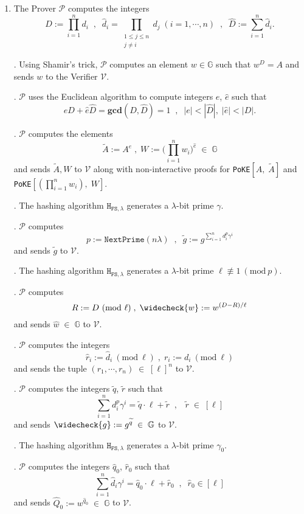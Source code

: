 \documentclass[11pt, lettersize, notitlepage, leqno, footskip=0.6cm]{article}
\newcommand{\pl}{\prod\limits}
\newcommand{\slim}{\sum\limits}
\newcommand{\ttt}{\texttt}
\newcommand{\bG}{\mathbb{G}}
\newcommand{\wti}{\widetilde}
\newcommand{\mc}{\mathcal}
\newcommand{\mb}{\mathbb}
\newcommand{\mbf}{\mathbf}
\newcommand{\lam}{\lambda}
\newcommand{\what}{\widehat}
\newcommand{\weck}{\widecheck}
\newcommand{\mP}{\mc{P}}
\newcommand{\V}{\mc{V}}
\newcommand{\vs}{\vspace{-0.15cm}}
\newcommand{\noin}{\noindent}
\newcommand{\Mod}[1]{\ (\mathrm{mod}\ #1)}
\newcommand{\GCD}{\mbf{gcd}}
\numberwithin{equation}{section}
\begin{document}
\begin{enumerate}[wide, labelwidth=!, labelindent=0pt]\vs \item The Prover $\mc{P}$ computes the integers \vs $$D := \prod\limits_{i=1}^n d_i\;\;,\;\;\what{d}_i = \pl_{\substack{1\leq j\leq n\\ j\neq i}} d_j\;(i=1,\cdots,n)\;\;,\;\; \what{D}:=\slim_{i=1}^n\what{d}_i.$$ \vs

\noin 2. Using Shamir's trick, $\mc{P}$ computes an element $w\in\mb{G}$ such that $w^D = A$ and sends $w$ to the Verifier $\mc{V}$.

\noin 3. $\mP$ uses the Euclidean algorithm to compute integers $e$, $\what{e}$ such that \vs $$eD+\what{e}\what{D} = \GCD(D,\what{D}) = 1\;\;,\;\;|e|< |\what{D}|,\;|\what{e}|< |{D}|.$$

\noin 4. $\mP$ computes the elements \vspace{-0.3cm} $$\wti{A}:= A^{e}\;,\;W := \big(\pl_{i=1}^n w_i\big)^{\what{e}}\;\in\;\bG$$ and sends $\wti{A},W$ to $\V$ along with non-interactive proofs for \verb|PoKE|$[A,\; \wti{A}]$ and \verb|PoKE|$[(\prod_{i=1}^n w_i),\; W]$.

\noin 5. The hashing algorithm $\ttt{H}_{\ttt{FS},\lam}$ generates a $\lam$-bit prime $\gamma$.

\noin 6. $\mc{P}$ computes \vs $$p:= \ttt{NextPrime}(n\lam)\;\;,\;\;\wti{g} := g^{\slim_{i=1}^n d_i^{p}\gamma^i}$$ and sends $\wti{g}$ to $\mc{V}$.

\noin 7. The hashing algorithm $\ttt{H}_{\ttt{FS},\lam}$ generates a $\lam$-bit prime $\ell\not\equiv 1\Mod{p}$.

\noin 8. $\mc{P}$ computes \vs $$R:= D\Mod{\ell}\;,\; \weck{w}:= w^{(D-R)/\ell}$$ and sends $\what{w}\;\in\;\bG$ to $\mc{V}$.

\noin 9. $\mc{P}$ computes the integers \vs $$\what{r}_i:= \what{d}_i\Mod{\ell}\;,\;{r}_i:= {d}_i\Mod{\ell}$$ and sends the tuple $(r_1,\cdots,r_n)\;\in\;[\ell]^n$ to $\mc{V}$.

\noin 10. $\mP$ computes the integers $\wti{q}$, $\wti{r}$ such that \vs $$\slim_{i=1}^n {d}_i^{p}\gamma^i = \wti{q}\cdot\ell+\wti{r}\;\;,\;\;\;\wti{r}\;\in\; [\ell]$$ and sends $ \weck{g}:= g^{\wti{q}}\;\in\;\bG$ to $\V$.

\noin 11. The hashing algorithm $\ttt{H}_{\ttt{FS},\lam}$ generates a $\lam$-bit prime $\gamma_{0}$.

\noin 12. $\mP$ computes the integers $\what{q}_0$, $ \what{r}_0$ such that \vs $$\slim_{i=1}^n \what{d}_i\gamma^i = \what{q}_0\cdot \ell+\what{r}_0\;\;,\;\;\what{r}_0\in [\ell]$$ and sends $\what{Q}_0:= w^{\what{q}_0} \;\in\;\bG$ to $\V$.


\end{enumerate}
\end{document}
